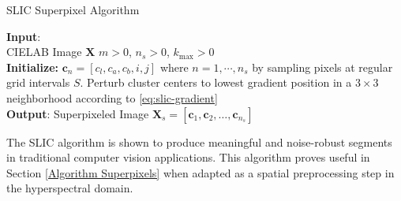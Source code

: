 \begin{algorithm}[H]
    \caption{SLIC Superpixel Algorithm}
    \textbf{Input}: \\
    \quad CIELAB Image $\mathbf{X}$
    \quad  $m > 0$, $n_s > 0$, $k_{\text{max}} > 0$
    \\
    \textbf{Initialize:} $\mathbf{c}_n = [c_{l}, c_{a}, c_{b}, i, j]$ where $n = 1, \cdots, n_s$ by sampling pixels at regular grid intervals $S$. Perturb cluster centers to lowest gradient position in a $3 \times 3$ neighborhood according to \eqref{eq:slic-gradient} \\
    
    \textbf{Output}: Superpixeled Image $\mathbf{X}_s = [\mathbf{c}_1, \mathbf{c}_2, \dots, \mathbf{c}_{n_s}]$
\end{algorithm}

The SLIC algorithm is shown to produce meaningful and noise-robust segments in traditional computer vision applications. This algorithm proves useful in Section \ref{Algorithm Superpixels} when adapted as a spatial preprocessing step in the hyperspectral domain.
